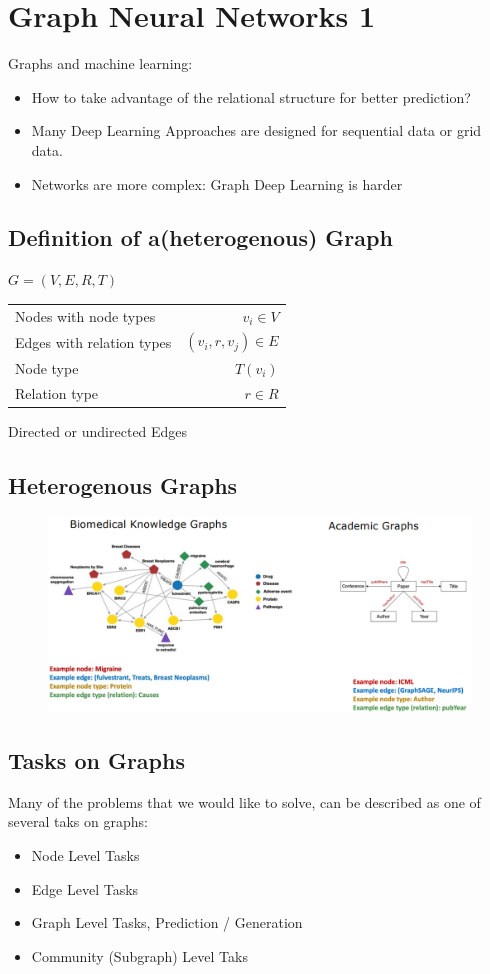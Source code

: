 \section{Graph Neural Networks 1}
Graphs and machine learning:
\begin{itemize}
    \item How to take advantage of the relational structure for better prediction?
    \item Many Deep Learning Approaches are designed for sequential data or grid data.
    \item Networks are more complex: Graph Deep Learning is harder
\end{itemize}
\subsection{Definition of a(heterogenous) Graph}
\(G = (V,E,R,T)\)
\begin{table}[!h]
    \begin{tabular}{lr}
    Nodes with node types    &  \(v_i \in V\)\\
    Edges with relation types     &  \((v_i,r,v_j) \in E\)\\
    Node type     &  \(T(v_i)\)\\
    Relation type     & \(r \in R\)
    \end{tabular}
\end{table}
Directed or undirected Edges
\subsection{Heterogenous Graphs}
\begin{figure}[!h]
    \includegraphics[width = \columnwidth]{figures/GraphNeuralNetworks1/HeterogenousGraphExample.png}
\end{figure}

\subsection{Tasks on Graphs}
Many of the problems that we would like to solve, can be described as one of several taks on graphs:
\begin{itemize}
    \item Node Level Tasks
    \item Edge Level Tasks
    \item Graph Level Tasks, Prediction / Generation
    \item Community (Subgraph) Level Taks
\end{itemize}

